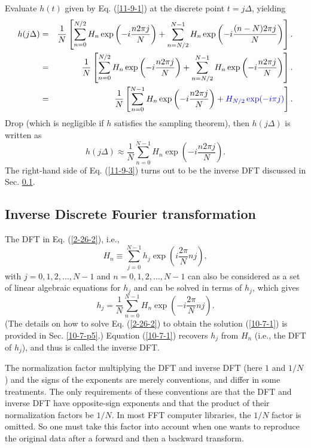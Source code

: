 \documentclass{article}
\newcommand{\tmcolor}[2]{{\color{#1}{#2}}}
\begin{document}
Evaluate $h (t)$ given by Eq. (\ref{11-9-1}) at the discrete point $t = j
\Delta$, yielding
\begin{eqnarray}
  h (j \Delta) & = & \frac{1}{N} \left[ \sum_{n = 0}^{N / 2} H_n \exp \left( -
  i \frac{n 2 \pi j}{N} \right) + \sum_{n = N / 2}^{N - 1} H_n \exp \left( - i
  \frac{(n - N) 2 \pi j}{N} \right) \right] . \nonumber\\
  & = & \frac{1}{N} \left[ \sum_{n = 0}^{N / 2} H_n \exp \left( - i \frac{n 2
  \pi j}{N} \right) + \sum_{n = N / 2}^{N - 1} H_n \exp \left( - i \frac{n 2
  \pi j}{N} \right) \right] . \nonumber\\
  & = & \frac{1}{N} \left[ \sum_{n = 0}^{N - 1} H_n \exp \left( - i \frac{n 2
  \pi j}{N} \right) + \tmcolor{blue}{H_{N / 2} \exp (- i \pi j)} \right] . 
\end{eqnarray}
Drop \tmcolor{blue}{the blue term} (which is negligible if $h$ satisfies the
sampling theorem), then $h (j \Delta)$ is written as
\begin{equation}
  \label{11-9-3} h (j \Delta) \approx \frac{1}{N} \sum_{n = 0}^{N - 1} H_n
  \exp \left( - i \frac{n 2 \pi j}{N} \right) .
\end{equation}
The right-hand side of Eq. (\ref{11-9-3}) turns out to be the inverse DFT
discussed in Sec. \ref{11-9-2}.

\subsection{Inverse Discrete Fourier transformation}\label{11-9-2}

The DFT in Eq. (\ref{2-26-2}), i.e.,
\begin{equation}
  \label{21-9-15-p1} H_n \equiv \sum_{j = 0}^{N - 1} h_j \exp \left( i \frac{2
  \pi}{N} n j \right),
\end{equation}
with $j = 0, 1, 2, \ldots, N - 1$ and $n = 0, 1, 2, \ldots, N - 1$ can also be
considered as a set of linear algebraic equations for $h_j$ and can be solved
in terms of $h_j$, which gives
\begin{equation}
  \label{10-7-1} h_j = \frac{1}{N} \sum_{n = 0}^{N - 1} H_n \exp \left( - i
  \frac{2 \pi}{N} n j \right) .
\end{equation}
(The details on how to solve Eq. (\ref{2-26-2}) to obtain the solution
(\ref{10-7-1}) is provided in Sec. \ref{10-7-p5}.) Equation (\ref{10-7-1})
recovers $h_j$ from $H_n$ (i.e., the DFT of $h_j$), and thus is called the
inverse DFT.

The normalization factor multiplying the DFT and inverse DFT (here $1$ and $1
/ N$) and the signs of the exponents are merely conventions, and differ in
some treatments. The only requirements of these conventions are that the DFT
and inverse DFT have opposite-sign exponents and that the product of their
normalization factors be $1 / N$. In most FFT computer libraries, the $1 / N$
factor is omitted. So one must take this factor into account when one wants to
reproduce the original data after a forward and then a backward transform.
\end{document}
